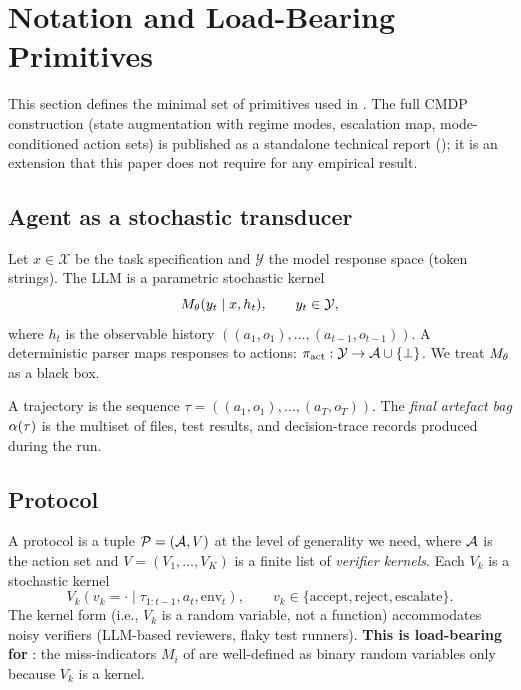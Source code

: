 \section{Notation and Load-Bearing Primitives}
\label{sec:formal-model}

This section defines the minimal set of primitives used in . The full CMDP construction (state augmentation with regime modes, escalation map, mode-conditioned action sets) is published as a standalone technical report (); it is an extension that this paper does not require for any empirical result.

\subsection{Agent as a stochastic transducer}

Let $x \in \mathcal{X}$ be the task specification and $\mathcal{Y}$ the model response space (token strings). The LLM is a parametric stochastic kernel
\begin{equation}
  M_\theta(y_t \mid x, h_t), \qquad y_t \in \mathcal{Y},
  \label{eq:llm-kernel}
\end{equation}
where $h_t$ is the observable history $((a_1, o_1), \ldots, (a_{t-1}, o_{t-1}))$. A deterministic parser maps responses to actions: $\pi_{\mathrm{act}}: \mathcal{Y} \to \mathcal{A} \cup \{\bot\}$. We treat $M_\theta$ as a black box.

A trajectory is the sequence $\tau = ((a_1, o_1), \ldots, (a_T, o_T))$. The \emph{final artefact bag} $\alpha(\tau)$ is the multiset of files, test results, and decision-trace records produced during the run.

\subsection{Protocol}

A protocol is a tuple $\mathcal{P} = (\mathcal{A}, V)$ at the level of generality we need, where $\mathcal{A}$ is the action set and $V = (V_1, \ldots, V_K)$ is a finite list of \emph{verifier kernels}. Each $V_k$ is a stochastic kernel
\begin{equation}
  V_k(v_k = \cdot \mid \tau_{1:t-1}, a_t, \mathrm{env}_t), \qquad v_k \in \{\mathrm{accept}, \mathrm{reject}, \mathrm{escalate}\}.
  \label{eq:verifier-kernel}
\end{equation}
The kernel form (i.e., $V_k$ is a random variable, not a function) accommodates noisy verifiers (LLM-based reviewers, flaky test runners). \textbf{This is load-bearing for }: the miss-indicators $M_i$ of  are well-defined as binary random variables only because $V_k$ is a kernel.

